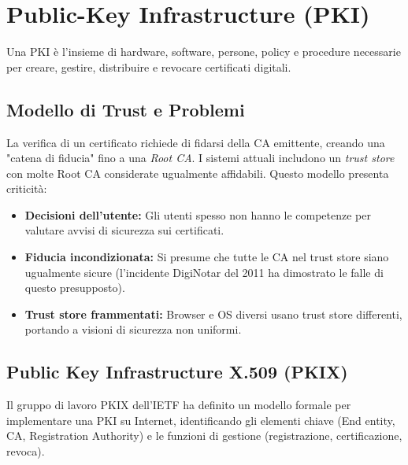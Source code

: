 \section{Public-Key Infrastructure (PKI)}

Una PKI è l'insieme di hardware, software, persone, policy e procedure necessarie per creare, gestire, distribuire e revocare certificati digitali. 



\subsection{Modello di Trust e Problemi}
La verifica di un certificato richiede di fidarsi della CA emittente, creando una "catena di fiducia" fino a una \textit{Root CA}. I sistemi attuali includono un \textit{trust store} con molte Root CA considerate ugualmente affidabili. Questo modello presenta criticità:
\begin{itemize}
    \item \textbf{Decisioni dell'utente:} Gli utenti spesso non hanno le competenze per valutare avvisi di sicurezza sui certificati.
    \item \textbf{Fiducia incondizionata:} Si presume che tutte le CA nel trust store siano ugualmente sicure (l'incidente DigiNotar del 2011 ha dimostrato le falle di questo presupposto).
    \item \textbf{Trust store frammentati:} Browser e OS diversi usano trust store differenti, portando a visioni di sicurezza non uniformi.
\end{itemize}

\subsection{Public Key Infrastructure X.509 (PKIX)}
Il gruppo di lavoro PKIX dell'IETF ha definito un modello formale per implementare una PKI su Internet, identificando gli elementi chiave (End entity, CA, Registration Authority) e le funzioni di gestione (registrazione, certificazione, revoca).